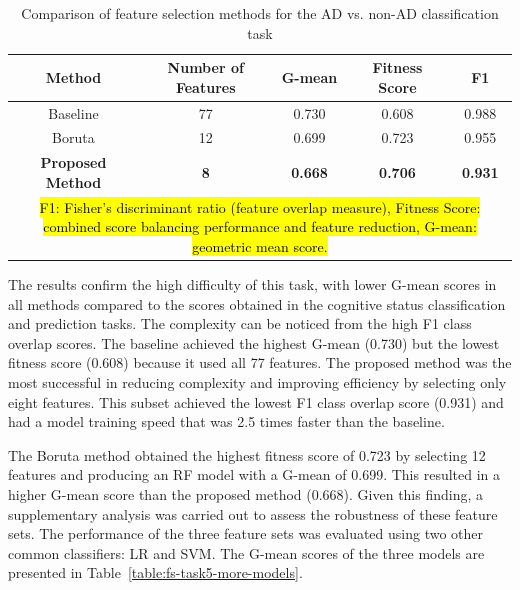 \begin{table}[!ht]
    \centering
    \caption{Comparison of feature selection methods for the AD vs. non-AD classification task}
    \begin{tabular}{|c|c|c|c|c|}
    \hline
        Method & Number of Features & G-mean & Fitness Score & F1 \\ \hline
        Baseline & 77 & 0.730 & 0.608 & 0.988 \\ \hline
        Boruta & 12 & 0.699 & 0.723 & 0.955 \\ \hline
        \textbf{Proposed Method} & \textbf{8} & \textbf{0.668} & \textbf{0.706} & \textbf{0.931} \\ \hline
        \multicolumn{5}{p{400pt}}{\footnotesize \hl{F1: Fisher's discriminant ratio (feature overlap measure), Fitness Score: combined score balancing performance and feature reduction, G-mean: geometric mean score.}}
    \end{tabular}
    \label{table:fs-task5}
\end{table}

The results confirm the high difficulty of this task, with lower G-mean scores in all methods compared to the scores obtained in the cognitive status classification and prediction tasks. The complexity can be noticed from the high F1 class overlap scores. The baseline achieved the highest G-mean (0.730) but the lowest fitness score (0.608) because it used all 77 features. The proposed method was the most successful in reducing complexity and improving efficiency by selecting only eight features. This subset achieved the lowest F1 class overlap score (0.931) and had a model training speed that was 2.5 times faster than the baseline.

The Boruta method obtained the highest fitness score of 0.723 by selecting 12 features and producing an RF model with a G-mean of 0.699. This resulted in a higher G-mean score than the proposed method (0.668). Given this finding, a supplementary analysis was carried out to assess the robustness of these feature sets. The performance of the three feature sets was evaluated using two other common classifiers: LR and SVM. The G-mean scores of the three models are presented in Table~\ref{table:fs-task5-more-models}.

